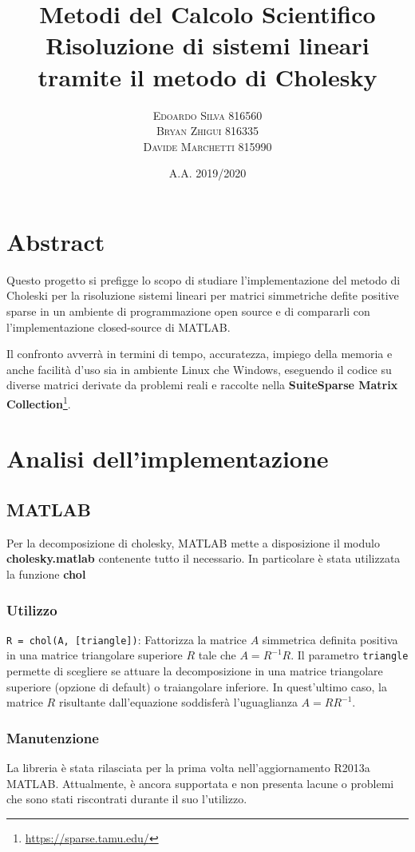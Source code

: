 \documentclass[11pt,italian]{article}
\title{
    Metodi del Calcolo Scientifico \\
    \normalsize Risoluzione di sistemi lineari tramite il metodo di Cholesky \\
}
\date{\small A.A. 2019/2020}
\author{
    \normalsize
    \textsc{Edoardo Silva} 816560 \\
    \normalsize
    \textsc{Bryan Zhigui} 816335 \\
    \normalsize
    \textsc{Davide Marchetti} 815990
}
\begin{document}
\maketitle

\section*{Abstract}
Questo progetto si prefigge lo scopo di studiare l'implementazione del metodo di Choleski per la risoluzione sistemi lineari per matrici simmetriche defite positive sparse in un ambiente di programmazione open source e di compararli con l'implementazione closed-source di MATLAB.

Il confronto avverrà in termini di tempo, accuratezza, impiego della memoria e anche facilità d'uso sia in ambiente Linux che Windows, eseguendo il codice su diverse matrici derivate da problemi reali e raccolte nella \textbf{SuiteSparse Matrix Collection}\footnote{\url{https://sparse.tamu.edu/}}.

\newpage
\section{Analisi dell'implementazione}

\subsection{MATLAB}
Per la decomposizione di cholesky, MATLAB mette a disposizione il modulo \textbf{cholesky.matlab} contenente tutto il necessario. In particolare è stata utilizzata la funzione \textbf{chol}

\subsubsection*{Utilizzo}
\lstinline{R = chol(A, [triangle])}: Fattorizza la matrice $A$ simmetrica definita positiva in una matrice triangolare superiore $R$ tale che $A=R^{-1}R$.
Il parametro \lstinline{triangle} permette di scegliere se attuare la decomposizione in una matrice triangolare superiore (opzione di default) o traiangolare inferiore. In quest'ultimo caso, la matrice $R$ risultante dall'equazione soddisferà l'uguaglianza $A = RR^{-1}$.

\subsubsection*{Manutenzione}
La libreria è stata rilasciata per la prima volta nell'aggiornamento R2013a MATLAB. Attualmente, è ancora supportata e non presenta lacune o problemi che sono stati riscontrati durante il suo l'utilizzo.
\end{document}
